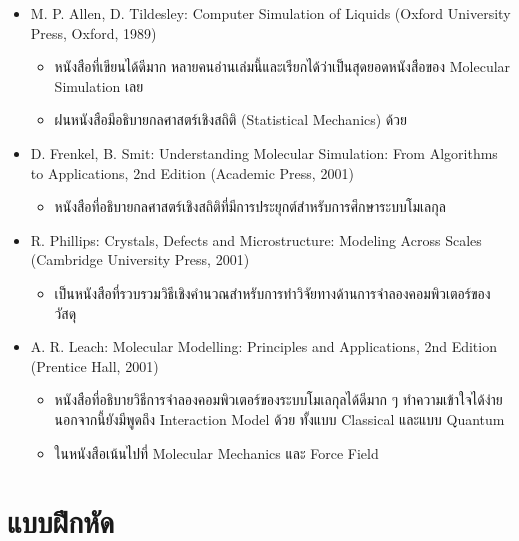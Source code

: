 \begin{itemize}[topsep=0pt,noitemsep]
  \setlength\itemsep{0.5em}
  \item M. P. Allen, D. Tildesley: Computer Simulation of Liquids (Oxford University Press, Oxford, 1989)
  \begin{itemize}[noitemsep]
  \setlength\itemsep{0.5em}
    \item หนังสือที่เขียนได้ดีมาก หลายคนอ่านเล่มนี้และเรียกได้ว่าเป็นสุดยอดหนังสือของ Molecular Simulation เลย

    \item ฝนหนังสือมีอธิบายกลศาสตร์เชิงสถิติ (Statistical Mechanics) ด้วย
  \end{itemize}

  \item D. Frenkel, B. Smit: Understanding Molecular Simulation: From Algorithms to Applications, 2nd Edition 
  (Academic Press, 2001) 
  \begin{itemize}[noitemsep]
  \setlength\itemsep{0.5em}
    \item หนังสือที่อธิบายกลศาสตร์เชิงสถิติที่มีการประยุกต์สำหรับการศึกษาระบบโมเลกุล
  \end{itemize}

  \item R. Phillips: Crystals, Defects and Microstructure: Modeling Across Scales (Cambridge University Press, 
  2001)
  \begin{itemize}[noitemsep]
  \setlength\itemsep{0.5em}
    \item เป็นหนังสือที่รวบรวมวิธีเชิงคำนวณสำหรับการทำวิจัยทางด้านการจำลองคอมพิวเตอร์ของวัสดุ
  \end{itemize}

  \item A. R. Leach: Molecular Modelling: Principles and Applications, 2nd Edition (Prentice Hall, 2001)
  \begin{itemize}[noitemsep]
  \setlength\itemsep{0.5em}
    \item หนังสือที่อธิบายวิธีการจำลองคอมพิวเตอร์ของระบบโมเลกุลได้ดีมาก ๆ ทำความเข้าใจได้ง่าย นอกจากนี้ยังมีพูดถึง Interaction Model 
    ด้วย ทั้งแบบ Classical และแบบ Quantum
    
    \item ในหนังสือเน้นไปที่ Molecular Mechanics และ Force Field
  \end{itemize}

\end{itemize}

\section{แบบฝึกหัด}
